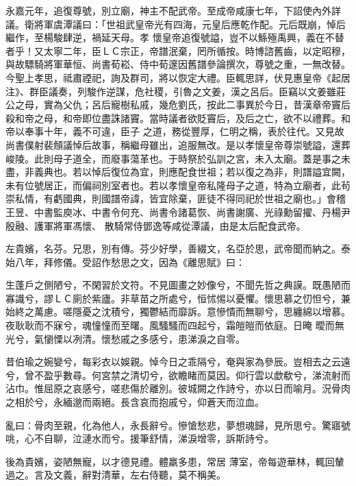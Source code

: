 \begin{pinyinscope}
 永嘉元年，追復尊號，別立廟，神主不配武帝。至成帝咸康七年，下詔使內外詳議。衛將軍虞潭議曰：「世祖武皇帝光有四海，元皇后應乾作配。元后既崩，悼后繼作，至楊駿肆逆，禍延天母。孝
 懷皇帝追復號謚，豈不以鯀殛禹興，義在不替者乎！又太寧二年，臣ＬＣ宗正，帝譜泯棄，罔所循按。時博諮舊齒，以定昭穆，與故驃騎將軍華恒、尚書荀崧、侍中荀邃因舊譜參論撰次，尊號之重，一無改替。今聖上孝思，祗肅禋祀，詢及群司，將以恢定大禮。臣輒思詳，伏見惠皇帝《起居注》、群臣議奏，列駿作逆謀，危社稷，引魯之文姜，漢之呂后。臣竊以文姜雖莊公之母，實為父仇；呂后寵樹私戚，幾危劉氏，按此二事異於今日，昔漢章帝竇后殺和帝之母，和帝即位盡誅諸竇。當時議者欲貶竇后，及后之亡，欲不以禮葬。和帝以奉事十年，義不可違，臣子
 之道，務從豐厚，仁明之稱，表於往代。又見故尚書僕射裴頠議悼后故事，稱繼母雖出，追服無改。是以孝懷皇帝尊崇號謚，還葬峻陵。此則母子道全，而廢事蕩革也。于時祭於弘訓之宮，未入太廟。蓋是事之未盡，非義典也。若以悼后復位為宜，則應配食世祖；若以復之為非，則譜謚宜闕，未有位號居正，而偏祠別室者也。若以孝懷皇帝私隆母子之道，特為立廟者，此茍崇私情，有虧國典，則國譜帝諱，皆宜除棄，匪徒不得同祀於世祖之廟也。」會稽王昱、中書監庾冰、中書令何充、尚書令諸葛恢、尚書謝廣、光祿勳留擢、丹楊尹殷融、護軍將軍馮懷、
 散騎常侍鄧逸等咸從潭議，由是太后配食武帝。



 左貴嬪，名芬。兄思，別有傳。芬少好學，善綴文，名亞於思，武帝聞而納之。泰始八年，拜修儀。受詔作愁思之文，因為《離思賦》曰：



 生蓬戶之側陋兮，不閑習於文符。不見圖畫之妙像兮，不聞先哲之典謨。既愚陋而寡識兮，謬ＬＣ廁於紫廬。非草苗之所處兮，恒怵惕以憂懼。懷思慕之忉怛兮，兼始終之萬慮。嗟隱憂之沈積兮，獨鬱結而靡訴。意慘憒而無聊兮，思纏綿以增慕。夜耿耿而不寐兮，魂憧憧而至曙。風騷騷而四起兮，霜皚皚而依庭。日晻
 曖而無光兮，氣懰慄以冽清。懷愁戚之多感兮，患涕淚之自零。



 昔伯瑜之婉孌兮，每彩衣以娛親。悼今日之乖隔兮，奄與家為參辰。豈相去之云遠兮，曾不盈乎數尋。何宮禁之清切兮，欲瞻睹而莫因。仰行雲以歔欷兮，涕流射而沾巾。惟屈原之哀感兮，嗟悲傷於離別。彼城闕之作詩兮，亦以日而喻月。況骨肉之相於兮，永緬邈而兩絕。長含哀而抱戚兮，仰蒼天而泣血。



 亂曰：骨肉至親，化為他人，永長辭兮。慘愴愁悲，夢想魂歸，見所思兮。驚寤號咷，心不自聊，泣漣水而兮。援筆舒情，涕淚增零，訴斯詩兮。



 後為貴嬪，姿陋無寵，以才德見禮。體羸多患，常居
 薄室，帝每遊華林，輒回輦過之。言及文義，辭對清華，左右侍聽，莫不稱美。




\end{pinyinscope}
